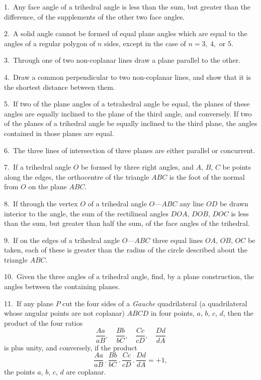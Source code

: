 \documentclass[oneside]{book}
\begin{document}
\begin{footnotesize}
1.~Any face angle of a trihedral angle is less than the sum, but
greater than the difference, of the supplements of the other two
face angles.

2.~A solid angle cannot be formed of equal plane angles which
are equal to the angles of a regular polygon of $n$ sides, except in
the case of $n = 3,\ 4, \text{\ or } 5$.

3.~Through one of two non-coplanar lines draw a plane parallel
to the other.

4.~Draw a common perpendicular to two non-coplanar lines,
and show that it is the shortest distance between them.

5.~If two of the plane angles of a tetrahedral angle be equal,
the planes of these angles are equally inclined to the plane of the
third angle, and conversely. If two of the planes of a trihedral
angle be equally inclined to the third plane, the angles contained
in those planes are equal.

6.~The three lines of intersection of three planes are either
parallel or concurrent.

7.~If a trihedral angle $O$ be formed by three right angles, and
$A$, $B$, $C$ be points along the edges, the orthocentre of the triangle
$ABC$ is the foot of the normal from $O$ on the plane $ABC$.

8.~If through the vertex $O$ of a trihedral angle $O$---$ABC$ any
line $OD$ be drawn interior to the angle, the sum of the rectilineal
angles $DOA$, $DOB$, $DOC$ is less than the sum, but greater than
half the sum, of the face angles of the trihedral.

9.~If on the edges of a trihedral angle $O$---$ABC$ three equal
lines $OA$, $OB$, $OC$ be taken, each of these is greater than the
radius of the circle described about the triangle $ABC$.

10.~Given the three angles of a trihedral angle, find, by a plane
construction, the angles between the containing planes.

11.~If any plane $P$ cut the four sides of a \emph{Gauche} quadrilateral
(a quadrilateral whose angular points are not coplanar) $ABCD$ in
four points, $a$, $b$, $c$, $d$, then the product of the four ratios
\[
  \frac{Aa}{aB},\quad
  \frac{Bb}{bC},\quad
  \frac{Cc}{cD},\quad
  \frac{Dd}{dA}
\]
is plus unity, and conversely, if the product
\[
  \frac{Aa}{aB} \,.\,
  \frac{Bb}{bC} \,.\,
  \frac{Cc}{cD} \,.\,
  \frac{Dd}{dA} = +1,
\]
the points $a$, $b$, $c$, $d$ are coplanar.


\end{footnotesize}
\end{document}
